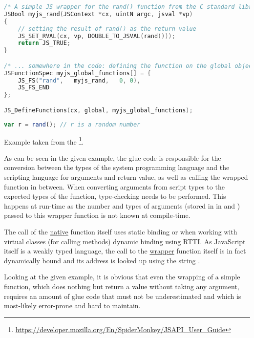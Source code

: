 \SingleSpacing
\begin{lstlisting}[language=C++, caption=Exposing a \myProperName{C} function to \myProperName{Spidermonkey}]
/* A simple JS wrapper for the rand() function from the C standard library */
JSBool myjs_rand(JSContext *cx, uintN argc, jsval *vp)
{
    // setting the result of rand() as the return value
    JS_SET_RVAL(cx, vp, DOUBLE_TO_JSVAL(rand()));
    return JS_TRUE;
}

/* ... somewhere in the code: defining the function on the global object so it can be used from the script */
JSFunctionSpec myjs_global_functions[] = {
    JS_FS("rand",   myjs_rand,   0, 0),
    JS_FS_END
};

JS_DefineFunctions(cx, global, myjs_global_functions);
\end{lstlisting}
\OnehalfSpacing

\SingleSpacing
\begin{lstlisting}[language=JavaScript, caption=Using a \myProperName{C} function from \myProperName{Spidermonkey}]
var r = rand();	// r is a random number
\end{lstlisting}
\OnehalfSpacing

Example taken from the \footnote{\url{https://developer.mozilla.org/En/SpiderMonkey/JSAPI_User_Guide}}.

As can be seen in the given example, the glue code is responsible for the conversion between the types of the system programming language and the scripting language for arguments and return value, as well as calling the wrapped function in between. When converting arguments from script types to the expected types of the function, type-checking needs to be performed. This happens at run-time as the number and types of arguments (stored in in  and ) passed to this wrapper function is not known at compile-time.

The call of the \underline{native} function  itself uses static binding or when working with virtual classes (for calling methods) dynamic binding using RTTI. As JavaScript itself is a weakly typed language, the call to the \underline{wrapper} function  itself is in fact dynamically bound and its address is looked up using the string .

Looking at the given example, it is obvious that even the wrapping of a simple  function, which does nothing but return a  value without taking any argument, requires an amount of glue code that must not be underestimated and which is most-likely error-prone and hard to maintain.

